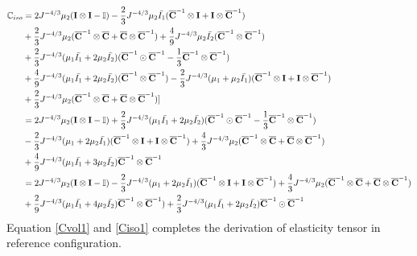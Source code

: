 \begin{equation} \label{Ciso1}
\begin{split}
\mathbb{C}_{iso} 
&= 
2{J}^{-4/3}\mu_2(\bold{I} \otimes \bold{I} - \mathbb{I}) - \frac{2}{3}J^{-4/3}\mu_2\bar{I_1}({\overline{\bold{C}}}^{-1} \otimes \bold{I} + \bold{I} \otimes {\overline{\bold{C}}}^{-1}) \\
&+
\frac{2}{3}J^{-4/3}\mu_2({\overline{\bold{C}}}^{-1} \otimes {\overline{\bold{C}}} + {\overline{\bold{C}}} \otimes {\overline{\bold{C}}}^{-1}) + \frac{4}{9}J^{-4/3}\mu_2\bar{I_2}({\overline{\bold{C}}}^{-1} \otimes {\overline{\bold{C}}}^{-1}) \\
&+
\frac{2}{3}J^{-4/3}(\mu_1\bar{I_1} + 2\mu_2\bar{I_2})({\overline{\bold{C}}}^{-1} \odot {{\overline{\bold{C}}}}^{-1} - \frac{1}{3}{{\overline{\bold{C}}}}^{-1} \otimes {\overline{{\bold{C}}}}^{-1}) \\
&+
\frac{4}{9}J^{-4/3} (\mu_1\bar{I_1} + 2\mu_2\bar{I_2})({\overline{\bold{C}}}^{-1} \otimes {\overline{\bold{C}}}^{-1}) - \frac{2}{3}J^{-4/3}(\mu_1+\mu_2\bar{I_1})({\overline{\bold{C}}}^{-1} \otimes \bold{I} + \bold{I} \otimes {\overline{\bold{C}}}^{-1})\\
&+ \frac{2}{3}J^{-4/3}\mu_2({\overline{\bold{C}}}^{-1} \otimes {\overline{\bold{C}}}+{\overline{\bold{C}}} \otimes {\overline{\bold{C}}}^{-1}) ] \\
&=
2{J}^{-4/3}\mu_2(\bold{I} \otimes \bold{I} - \mathbb{I}) + \frac{2}{3}J^{-4/3}(\mu_1\bar{I_1} + 2\mu_2\bar{I_2})({\overline{\bold{C}}}^{-1} \odot {\overline{\bold{C}}}^{-1} - \frac{1}{3}{\overline{\bold{C}}}^{-1} \otimes {\overline{\bold{C}}}^{-1}) \\
&-
\frac{2}{3}J^{-4/3}(\mu_1 + 2\mu_2\bar{I_1})({\overline{\bold{C}}}^{-1} \otimes \bold{I} + \bold{I} \otimes {\overline{\bold{C}}}^{-1}) + \frac{4}{3}J^{-4/3}\mu_2({\overline{\bold{C}}}^{-1} \otimes {\overline{\bold{C}}} + {\overline{\bold{C}}} \otimes {\overline{\bold{C}}}^{-1}) \\
&+
\frac{4}{9}J^{-4/3}(\mu_1\bar{I_1} + 3\mu_2\bar{I_2}){\overline{\bold{C}}}^{-1} \otimes {\overline{\bold{C}}}^{-1} \\
&=
2{J}^{-4/3}\mu_2(\bold{I} \otimes \bold{I} - \mathbb{I}) - \frac{2}{3}J^{-4/3}(\mu_1 + 2\mu_2\bar{I_1})({\overline{\bold{C}}}^{-1} \otimes \bold{I} + \bold{I} \otimes {\overline{\bold{C}}}^{-1}) + \frac{4}{3}J^{-4/3}\mu_2({\overline{\bold{C}}}^{-1} \otimes {\overline{\bold{C}}} + {\overline{\bold{C}}} \otimes {\overline{\bold{C}}}^{-1}) \\
&+
\frac{2}{9}J^{-4/3}(\mu_1\bar{I_1} + 4\mu_2\bar{I_2}) {\overline{\bold{C}}}^{-1} \otimes {\overline{\bold{C}}}^{-1}) + \frac{2}{3}J^{-4/3}(\mu_1\bar{I_1} + 2\mu_2\bar{I_2}){\overline{\bold{C}}}^{-1} \odot {\overline{\bold{C}}}^{-1} 
\end{split}
\end{equation} 
Equation \ref{Cvol1} and \ref{Ciso1} completes the derivation of elasticity tensor in reference configuration.



